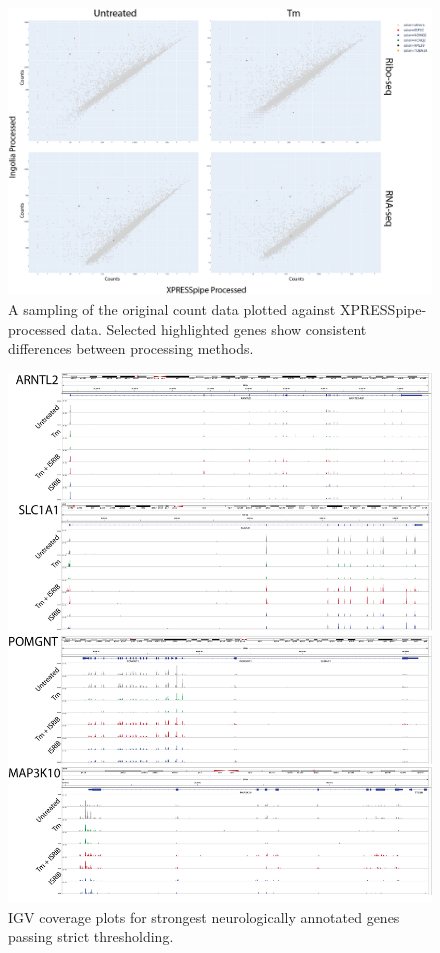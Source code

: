 \documentclass[11pt, a4paper, oneside]{article}
\begin{document}
\begin{figure}
\centering
  \includegraphics[width=160mm]{figures/xpresspipe_supplement2.png}
  \caption{A sampling of the original count data plotted against XPRESSpipe-processed data. Selected highlighted genes show consistent differences between processing methods.}
  \label{fig:supplement2}
\end{figure}

\begin{figure}
\centering
  \includegraphics[width=180mm]{figures/xpresspipe_supplement3.png}
  \caption{IGV coverage plots for strongest neurologically annotated genes passing strict thresholding.}
  \label{fig:supplement3}
\end{figure}
\end{document}
